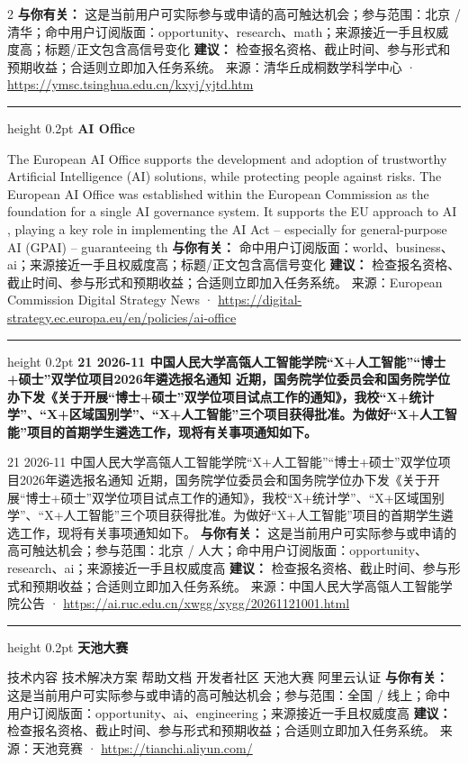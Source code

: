 \documentclass[10.5pt]{ctexart}
\begin{document}
\begin{multicols}{2}
\textbf{与你有关：} 这是当前用户可实际参与或申请的高可触达机会；参与范围：北京 / 清华；命中用户订阅版面：opportunity、research、math；来源接近一手且权威度高；标题/正文包含高信号变化
\textbf{建议：} 检查报名资格、截止时间、参与形式和预期收益；合适则立即加入任务系统。
{\footnotesize\color{ormuted} 来源：清华丘成桐数学科学中心 · \url{https://ymsc.tsinghua.edu.cn/kxyj/yjtd.htm}}
\vspace{2mm}
\hrule height 0.2pt
\vspace{2mm}
{\large\bfseries AI Office}\par
The European AI Office supports the development and adoption of trustworthy Artificial Intelligence (AI) solutions, while protecting people against risks. The European AI Office was established within the European Commission as the foundation for a single AI governance system. It supports the EU approach to AI , playing a key role in implementing the AI Act – especially for general-purpose AI (GPAI) – guaranteeing th
\textbf{与你有关：} 命中用户订阅版面：world、business、ai；来源接近一手且权威度高；标题/正文包含高信号变化
\textbf{建议：} 检查报名资格、截止时间、参与形式和预期收益；合适则立即加入任务系统。
{\footnotesize\color{ormuted} 来源：European Commission Digital Strategy News · \url{https://digital-strategy.ec.europa.eu/en/policies/ai-office}}
\vspace{2mm}
\hrule height 0.2pt
\vspace{2mm}
{\large\bfseries 21 2026-11 中国人民大学高瓴人工智能学院“X+人工智能”“博士+硕士”双学位项目2026年遴选报名通知 近期，国务院学位委员会和国务院学位办下发《关于开展“博士+硕士”双学位项目试点工作的通知》，我校“X+统计学”、“X+区域国别学”、“X+人工智能”三个项目获得批准。为做好“X+人工智能”项目的首期学生遴选工作，现将有关事项通知如下。}\par
21 2026-11 中国人民大学高瓴人工智能学院“X+人工智能”“博士+硕士”双学位项目2026年遴选报名通知 近期，国务院学位委员会和国务院学位办下发《关于开展“博士+硕士”双学位项目试点工作的通知》，我校“X+统计学”、“X+区域国别学”、“X+人工智能”三个项目获得批准。为做好“X+人工智能”项目的首期学生遴选工作，现将有关事项通知如下。
\textbf{与你有关：} 这是当前用户可实际参与或申请的高可触达机会；参与范围：北京 / 人大；命中用户订阅版面：opportunity、research、ai；来源接近一手且权威度高
\textbf{建议：} 检查报名资格、截止时间、参与形式和预期收益；合适则立即加入任务系统。
{\footnotesize\color{ormuted} 来源：中国人民大学高瓴人工智能学院公告 · \url{https://ai.ruc.edu.cn/xwgg/xygg/20261121001.html}}
\vspace{2mm}
\hrule height 0.2pt
\vspace{2mm}
{\large\bfseries 天池大赛}\par
技术内容 技术解决方案 帮助文档 开发者社区 天池大赛 阿里云认证
\textbf{与你有关：} 这是当前用户可实际参与或申请的高可触达机会；参与范围：全国 / 线上；命中用户订阅版面：opportunity、ai、engineering；来源接近一手且权威度高
\textbf{建议：} 检查报名资格、截止时间、参与形式和预期收益；合适则立即加入任务系统。
{\footnotesize\color{ormuted} 来源：天池竞赛 · \url{https://tianchi.aliyun.com/}}
\end{multicols}
\end{document}
